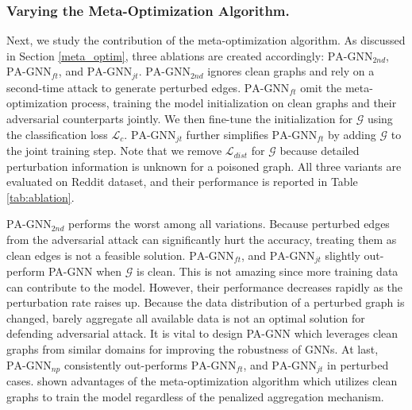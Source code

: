 \documentclass[sigconf]{acmart}
\newcommand{\our}{{PA-GNN}\xspace}
\newcommand{\ours}{{PA-GNN}\xspace}
\def \G {\mathcal{G}}
\def \L {\mathcal{L}}
\begin{document}
\subsubsection{Varying the Meta-Optimization Algorithm.}
\label{ablation:meta}
Next, we study the contribution of the meta-optimization algorithm. As discussed in Section \ref{meta_optim}, three ablations are created accordingly: $\text{\our}_{2nd}$, $\text{\our}_{ft}$, and $\text{\our}_{jt}$.
$\text{\our}_{2nd}$ ignores clean graphs and rely on a second-time attack to generate perturbed edges.
$\text{\our}_{ft}$ omit the meta-optimization process, training the model initialization on clean graphs and their adversarial counterparts jointly. We then fine-tune the initialization for $\G$ using the classification loss $\L_c$.
$\text{\our}_{jt}$ further simplifies $\text{\our}_{ft}$ by adding $\G$ to the joint training step. Note that we remove $\L_{dist}$ for $\G$ because detailed perturbation information is unknown for a poisoned graph.
All three variants are evaluated on Reddit dataset, and their performance is reported in Table \ref{tab:ablation}.

$\text{\our}_{2nd}$ performs the worst among all variations. Because perturbed edges from the adversarial attack can significantly hurt the accuracy, treating them as clean edges  is not a feasible solution.
$\text{\our}_{ft}$, and $\text{\our}_{jt}$ slightly out-perform \ours when $\G$ is clean. This is not amazing since more training data can contribute to the model. However, their performance decreases rapidly as the perturbation rate raises up. Because the data distribution of a perturbed graph is changed, barely aggregate all available data is not an optimal solution for defending adversarial attack. It is vital to design \ours which leverages clean graphs from similar domains for improving the robustness of GNNs.
At last, $\text{\our}_{np}$ consistently out-performs $\text{\our}_{ft}$, and $\text{\our}_{jt}$ in perturbed cases. shown advantages of the meta-optimization algorithm which utilizes clean graphs to train the model regardless of the penalized aggregation mechanism.
\end{document}
